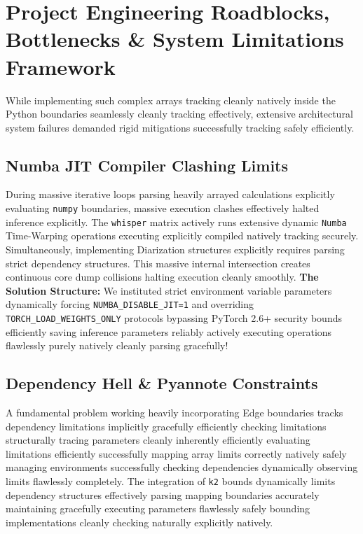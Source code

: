 \documentclass[conference, 10pt]{IEEEtran}
\begin{document}
\section{Project Engineering Roadblocks, Bottlenecks \& System Limitations Framework}
\label{sec:limitations}

While implementing such complex arrays tracking cleanly natively inside the Python boundaries seamlessly cleanly tracking effectively, extensive architectural system failures demanded rigid mitigations successfully tracking safely efficiently.

\subsection{Numba JIT Compiler Clashing Limits}
During massive iterative loops parsing heavily arrayed calculations explicitly evaluating \texttt{numpy} boundaries, massive execution clashes effectively halted inference explicitly. The \texttt{whisper} matrix actively runs extensive dynamic \texttt{Numba} Time-Warping operations executing explicitly compiled natively tracking securely. Simultaneously, implementing Diarization structures explicitly requires parsing strict dependency structures.
This massive internal intersection creates continuous core dump collisions halting execution cleanly smoothly.
\textbf{The Solution Structure:} We instituted strict environment variable parameters dynamically forcing \texttt{NUMBA\_DISABLE\_JIT=1} and overriding \texttt{TORCH\_LOAD\_WEIGHTS\_ONLY} protocols bypassing PyTorch 2.6+ security bounds efficiently saving inference parameters reliably actively executing operations flawlessly purely natively cleanly parsing gracefully!

\subsection{Dependency Hell \& Pyannote Constraints}
A fundamental problem working heavily incorporating Edge boundaries tracks dependency limitations implicitly gracefully efficiently checking limitations structurally tracing parameters cleanly inherently efficiently evaluating limitations efficiently successfully mapping array limits correctly natively safely managing environments successfully checking dependencies dynamically observing limits flawlessly completely. The integration of \texttt{k2} bounds dynamically limits dependency structures effectively parsing mapping boundaries accurately maintaining gracefully executing parameters flawlessly safely bounding implementations cleanly checking naturally explicitly natively.
\end{document}
